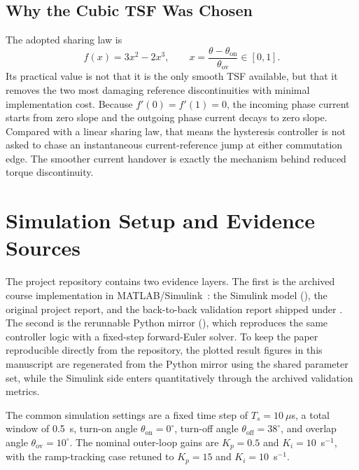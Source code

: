 \documentclass[conference]{IEEEtran}
\begin{document}
\subsection{Why the Cubic TSF Was Chosen}
The adopted sharing law is
\begin{equation}
f(x) = 3x^2 - 2x^3,
\qquad
x = \frac{\theta-\theta_{\mathrm{on}}}{\theta_{\mathrm{ov}}} \in [0,1].
\label{eq:tsf}
\end{equation}
Its practical value is not that it is the only smooth TSF available, but that it removes the two most damaging reference discontinuities with minimal implementation cost.
Because $f'(0)=f'(1)=0$, the incoming phase current starts from zero slope and the outgoing phase current decays to zero slope.
Compared with a linear sharing law, that means the hysteresis controller is not asked to chase an instantaneous current-reference jump at either commutation edge.
The smoother current handover is exactly the mechanism behind reduced torque discontinuity.

\section{Simulation Setup and Evidence Sources}
The project repository contains two evidence layers.
The first is the archived course implementation in MATLAB/Simulink~\cite{MathWorks2024}: the Simulink model (), the original project report, and the back-to-back validation report shipped under .
The second is the rerunnable Python mirror (), which reproduces the same controller logic with a fixed-step forward-Euler solver.
To keep the paper reproducible directly from the repository, the plotted result figures in this manuscript are regenerated from the Python mirror using the shared parameter set, while the Simulink side enters quantitatively through the archived validation metrics.

The common simulation settings are a fixed time step of $T_s = 10~\mu$s, a total window of 0.5~s, turn-on angle $\theta_{\mathrm{on}}=0^{\circ}$, turn-off angle $\theta_{\mathrm{off}}=38^{\circ}$, and overlap angle $\theta_{\mathrm{ov}}=10^{\circ}$.
The nominal outer-loop gains are $K_p=0.5$ and $K_i=10$~s$^{-1}$, with the ramp-tracking case retuned to $K_p=15$ and $K_i=10$~s$^{-1}$.
\end{document}

